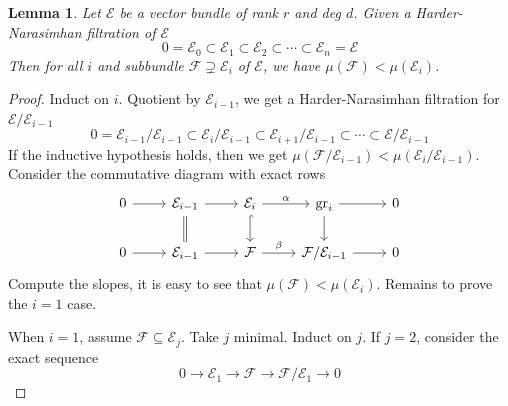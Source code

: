 \documentclass{ctexart}
\newtheorem{lemma}{Lemma}[section]
\newcommand{\grade}{\operatorname{gr}}
\begin{document}
\begin{lemma}
    Let $\mathcal{E}$ be a vector bundle of rank $r$ and deg $d$.
    Given a Harder-Narasimhan filtration of $\mathcal{E}$
    \begin{equation}
        0 = \mathcal{E}_{0} \subset \mathcal{E}_{1} \subset \mathcal{E}_{2} \subset \cdots \subset \mathcal{E}_{n} = \mathcal{E}        
    \end{equation}
    Then for all $i$ and subbundle $\mathcal{F} \supsetneq \mathcal{E}_{i}$ of $\mathcal{E}$, we have $\mu(\mathcal{F}) < \mu(\mathcal{E}_{i})$.
    \label{Lemma 7.17}
\end{lemma}
\begin{proof}
    Induct on $i$.
    Quotient by $\mathcal{E}_{i - 1}$, we get a Harder-Narasimhan filtration for $\mathcal{E}/\mathcal{E}_{i - 1}$
    \begin{equation}
        0 = \mathcal{E}_{i - 1}/\mathcal{E}_{i - 1} \subset \mathcal{E}_{i}/\mathcal{E}_{i - 1} \subset \mathcal{E}_{i + 1}/\mathcal{E}_{i - 1} \subset \cdots \subset \mathcal{E}/\mathcal{E}_{i - 1}
    \end{equation}
    If the inductive hypothesis holds, then we get $\mu(\mathcal{F}/\mathcal{E}_{i - 1}) < \mu(\mathcal{E}_{i}/\mathcal{E}_{i - 1})$.
    Consider the commutative diagram with exact rows
    \begin{equation}
        \begin{tikzcd}
            0 \arrow[r] &
            \mathcal{E}_{i - 1} \arrow[r] \arrow[d, equal] &
            \mathcal{E}_{i} \arrow[r, "\alpha"] \arrow[d, hookrightarrow] &
            \grade_{i} \arrow[r] \arrow[d] &
            0 \\
            0 \arrow[r] &
            \mathcal{E}_{i - 1} \arrow[r] &
            \mathcal{F} \arrow[r, "\beta"] &
            \mathcal{F}/\mathcal{E}_{i - 1} \arrow[r] &
            0
        \end{tikzcd}
    \end{equation}
    Compute the slopes, it is easy to see that $\mu(\mathcal{F}) < \mu(\mathcal{E}_{i})$.
    Remains to prove the $i = 1$ case.
    \par
    When $i = 1$, assume $\mathcal{F} \subseteq \mathcal{E}_{j}$.
    Take $j$ minimal.
    Induct on $j$.
    If $j = 2$, consider the exact sequence
    \begin{equation}
        0 \longrightarrow \mathcal{E}_{1} \longrightarrow \mathcal{F} \longrightarrow \mathcal{F}/\mathcal{E}_{1} \longrightarrow 0
    \end{equation}

\end{proof}
\end{document}
